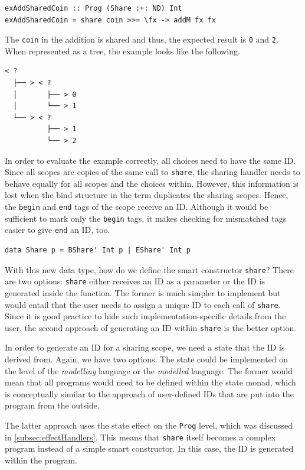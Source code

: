 \documentclass[a4paper, 11pt, fleqn, twoside]{scrreprt}
\newcommand{\hinl}[1]{\texttt{#1}}
\begin{document}
\begin{verbatim}
exAddSharedCoin :: Prog (Share :+: ND) Int
exAddSharedCoin = share coin >>= \fx -> addM fx fx
\end{verbatim}

The \hinl{coin} in the addition is shared and thus, the expected result is \hinl{0} and \hinl{2}.
When represented as a tree, the example looks like the following.

\begin{verbatim}
< ? 
  ├── > < ? 
  │       ├── > 0
  │       └── > 1
  └── > < ? 
          ├── > 1
          └── > 2
\end{verbatim}

In order to evaluate the example correctly, all choices need to have the same ID.
Since all scopes are copies of the same call to \hinl{share}, the sharing handler needs to behave equally for all scopes and the choices within.
However, this information is lost when the bind structure in the term duplicates the sharing scopes.
Hence, the \hinl{begin} and \hinl{end} tags of the scope receive an ID.
Although it would be sufficient to mark only the \hinl{begin} tags, it makes checking for mismatched tags easier to give \hinl{end} an ID, too.

\begin{verbatim}
data Share p = BShare' Int p | EShare' Int p
\end{verbatim}

With this new data type, how do we define the smart constructor \hinl{share}?
There are two options: \hinl{share} either receives an ID as a parameter or the ID is generated inside the function.
The former is much simpler to implement but would entail that the user needs to assign a unique ID to each call of \hinl{share}.
Since it is good practice to hide such implementation-specific details from the user, the second approach of generating an ID within \hinl{share} is the better option.

In order to generate an ID for a sharing scope, we need a state that the ID is derived from.
Again, we have two options.
The state could be implemented on the level of the \textit{modelling} language or the \textit{modelled} language.
The former would mean that all programs would need to be defined within the state monad, which is conceptually similar to the approach of user-defined IDs that are put into the program from the outside.

The latter approach uses the state effect on the \hinl{Prog} level, which was discussed in \autoref{subsec:effectHandlers}.
This means that \hinl{share} itself becomes a complex program instead of a simple smart constructor.
In this case, the ID is generated within the program.
\end{document}
